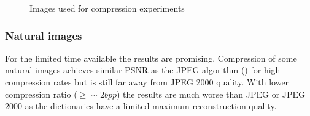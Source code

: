 \begin{figure}[h]
\hspace{5mm}
\hspace{5mm}
\hspace{5mm}
\hspace{5mm}
\caption{Images used for compression experiments}
\label{fig:comp_images}
\end{figure}

\newpage
\subsubsection{Natural images}
For the limited time available the results are promising.
Compression of some natural images achieves similar PSNR as the JPEG algorithm
() for high compression rates but is still far away
from JPEG 2000 quality. With lower compression ratio ($\ge\sim2bpp$) the results
are much worse than JPEG or JPEG 2000 as the dictionaries have a limited maximum
reconstruction quality.

